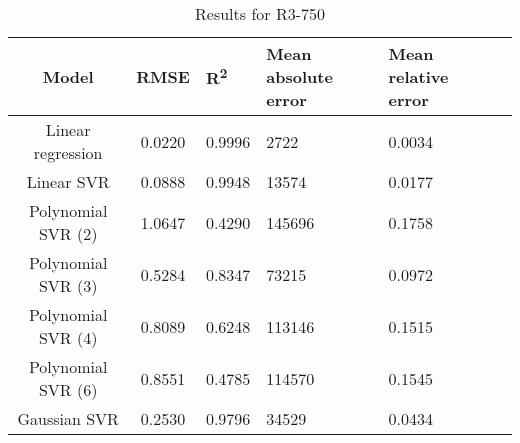 \begin{table}[H]
\centering
\begin{adjustbox}{center}
\begin{tabular}{c | c M{1.2cm} M{2.5cm} M{2.5cm} M{1.8cm}}
Model & RMSE & R\textsuperscript{2} & Mean absolute error & Mean relative error \tabularnewline
\hline
Linear regression & 0.0220 & 0.9996 &   2722 & 0.0034 \\
Linear SVR & 0.0888 & 0.9948 &  13574 & 0.0177 \\
Polynomial SVR (2) & 1.0647 & 0.4290 & 145696 & 0.1758 \\
Polynomial SVR (3) & 0.5284 & 0.8347 &  73215 & 0.0972 \\
Polynomial SVR (4) & 0.8089 & 0.6248 & 113146 & 0.1515 \\
Polynomial SVR (6) & 0.8551 & 0.4785 & 114570 & 0.1545 \\
Gaussian SVR & 0.2530 & 0.9796 &  34529 & 0.0434 \\
\end{tabular}
\end{adjustbox}
\\
\caption{Results for R3-750}
\label{tab:coreonly_linear_R3_750}
\end{table}
